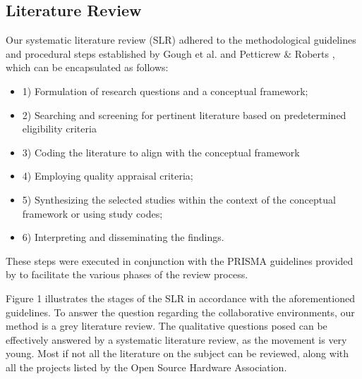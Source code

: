 \documentclass[final-report.tex]{subfiles}
\begin{document}
\subsection{Literature Review}

Our systematic literature review (SLR) adhered to the methodological guidelines and procedural steps established by Gough et al. \cite{gough2017introduction} and Petticrew \& Roberts \cite{petticrew2008systematic}, which can be encapsulated as follows:
\begin{itemize}
    \item 1) Formulation of research questions and a conceptual framework; 
    \item 2) Searching and screening for pertinent literature based on predetermined eligibility criteria
    \item 3) Coding the literature to align with the conceptual framework
    \item 4) Employing quality appraisal criteria;
    \item 5) Synthesizing the selected studies within the context of the conceptual framework or using study codes;
    \item 6) Interpreting and disseminating the findings. 
\end{itemize}
These steps were executed in conjunction with the PRISMA guidelines provided by \cite{page2021prisma} to facilitate the various phases of the review process. 

Figure 1 
illustrates the stages of the SLR in accordance with the aforementioned guidelines.
To answer the question regarding the collaborative environments, our method is a grey literature review. 
The qualitative questions posed can be effectively answered by a systematic literature review, as the movement is very young. 
Most if not all the literature on the subject can be reviewed, along with all the projects listed by the Open Source Hardware Association.


\end{document}
